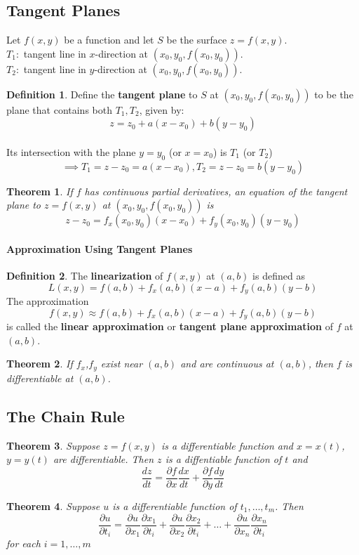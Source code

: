 \documentclass[12 pt]{article}
\newtheorem{thm}{Theorem}
\theoremstyle{definition}
\newtheorem{defn}{Definition}
\begin{document}
\subsection{Tangent Planes} Let $f(x,y)$ be a function and let $S$ be the surface $z=f(x,y)$. 
\\ $T_1:$ tangent line in $x$-direction at $(x_0,y_0,f(x_0,y_0))$.
\\ $T_2:$ tangent line in $y$-direction at $(x_0,y_0,f(x_0,y_0))$.
\begin{defn}
	Define the \textbf{tangent plane} to $S$ at $(x_0,y_0,f(x_0,y_0))$ to be the plane that contains both $T_1,T_2$, given by: $$z=z_0+a(x-x_0)+b(y-y_0)$$
	\\ Its intersection with the plane $y=y_0$ (or $x=x_0$) is $T_1$ (or $T_2$)
	$$\implies T_1=z-z_0=a(x-x_0),T_2=z-z_0=b(y-y_0)$$
\end{defn}
\begin{thm}
	If $f$ has continuous partial derivatives, an equation of the tangent plane to $z=f(x,y)$ at $(x_0,y_0,f(x_0,y_0))$ is $$z-z_0=f_x(x_0,y_0)(x-x_0)+f_y(x_0,y_0)(y-y_0)$$
\end{thm}
\paragraph{Approximation Using Tangent Planes}
\begin{defn}
	The \textbf{linearization} of $f(x,y)$ at $(a,b)$ is defined as $$L(x,y)=f(a,b)+f_x(a,b)(x-a)+f_y(a,b)(y-b)$$
	The approximation $$f(x,y)\approx f(a,b)+f_x(a,b)(x-a)+f_y(a,b)(y-b)$$ is called the \textbf{linear approximation} or \textbf{tangent plane approximation} of $f$ at $(a,b)$.
\end{defn}
\begin{thm}
	If $f_x$,$f_y$ exist near $(a,b)$ and are continuous at $(a,b)$, then $f$ is differentiable at $(a,b)$.
\end{thm}
\subsection{The Chain Rule}
\begin{thm}
  Suppose $z=f(x,y)$ is a differentiable function and $x=x(t)$, $y=y(t)$ are differentiable. Then $z$ is a diffentiable function of $t$ and
  $$\frac{dz}{dt}=\frac{\partial f}{\partial x}\frac{dx}{dt}+\frac{\partial f}{\partial y}\frac{dy}{dt}$$
\end{thm}
\begin{thm}
  Suppose $u$ is a differentiable function of $t_1,\ldots,t_m$. Then
  $$ \frac{\partial u}{\partial t_i}=\frac{\partial u}{\partial x_1}\frac{\partial x_1}{\partial t_i}+\frac{\partial u}{\partial x_2} \frac{\partial x_2}{\partial t_i}+\ldots + \frac{\partial u}{\partial x_n}\frac{\partial x_n}{\partial t_i}$$ for each $i=1,\ldots, m$ 
\end{thm}
\end{document}
